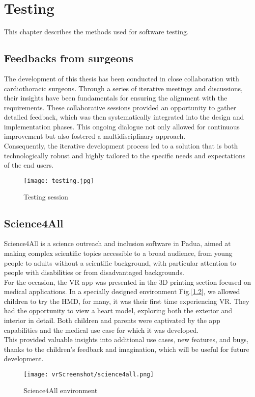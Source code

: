 \chapter{Testing}
\label{chp:testing}
\noindent
This chapter describes the methods used for software testing.

\section{Feedbacks from surgeons}
\noindent
The development of this thesis has been conducted in close collaboration with cardiothoracic surgeons.
Through a series of iterative meetings and discussions, their insights have been fundamentals for ensuring the alignment with the requirements.
These collaborative sessions provided an opportunity to gather detailed feedback, which was then systematically integrated into the design and implementation phases.
This ongoing dialogue not only allowed for continuous improvement but also fostered a multidisciplinary approach.\\
Consequently, the iterative development process led to a solution that is both technologically robust and highly tailored to the specific needs and expectations of the end users.

\begin{figure}[ht]
  \centering
  \texttt{[image: testing.jpg]}
  \caption{Testing session}
  \label{fig:testing}
\end{figure}

\section{Science4All}
\noindent
Science4All is a science outreach and inclusion software in Padua, aimed at making complex scientific topics accessible to a broad audience,
from young people to adults without a scientific background, with particular attention to people with disabilities or from disadvantaged backgrounds.\\
For the occasion, the \ac{VR} app was presented in the 3D printing section focused on medical applications. In a specially designed environment Fig.[\ref{fig:science4all}], we allowed children to try the \ac{HMD}, for many, it was their first time experiencing \ac{VR}. They had the opportunity to view a heart model, exploring both the exterior and interior in detail.
Both children and parents were captivated by the app capabilities and the medical use case for which it was developed.\\
This provided valuable insights into additional use cases, new features, and bugs, thanks to the children's feedback and imagination, which will be useful for future development.

\begin{figure}[hb]
  \centering
  \texttt{[image: vrScreenshot/science4all.png]}
  \caption{Science4All environment}
  \label{fig:science4all}
\end{figure}